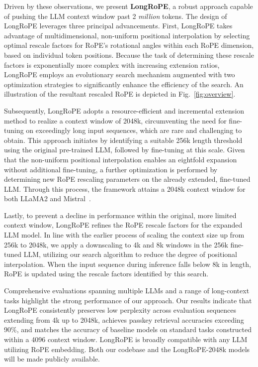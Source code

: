 Driven by these observations, we present \textbf{LongRoPE}, a robust approach capable of pushing the LLM context window past 2 \emph{million} tokens. The design of LongRoPE leverages three principal advancements. First, LongRoPE takes advantage of multidimensional, non-uniform positional interpolation by selecting optimal rescale factors for RoPE's rotational angles within each RoPE dimension, based on individual token positions. Because the task of determining these rescale factors is exponentially more complex with increasing extension ratios, LongRoPE employs an evolutionary search mechanism augmented with two optimization strategies to significantly enhance the efficiency of the search. An illustration of the resultant rescaled RoPE is depicted in Fig.~\ref{fig:overview}.

Subsequently, {LongRoPE} adopts a resource-efficient and incremental extension method to realize a context window of 2048k, circumventing the need for fine-tuning on exceedingly long input sequences, which are rare and challenging to obtain. This approach initiates by identifying a suitable 256k length threshold using the original pre-trained LLM, followed by fine-tuning at this scale. Given that the non-uniform positional interpolation enables an eightfold expansion without additional fine-tuning, a further optimization is performed by determining new RoPE rescaling parameters on the already extended, fine-tuned LLM. Through this process, the framework attains a 2048k context window for both LLaMA2 and Mistral~\cite{mistral}.

Lastly, to prevent a decline in performance within the original, more limited context window, {LongRoPE} refines the RoPE rescale factors for the expanded LLM model. In line with the earlier process of scaling the context size up from 256k to 2048k, we apply a downscaling to 4k and 8k windows in the 256k fine-tuned LLM, utilizing our search algorithm to reduce the degree of positional interpolation. When the input sequence during inference falls below 8k in length, RoPE is updated using the rescale factors identified by this search.

Comprehensive evaluations spanning multiple LLMs and a range of long-context tasks highlight the strong performance of our approach. Our results indicate that LongRoPE consistently preserves low perplexity across evaluation sequences extending from 4k up to 2048k, achieves passkey retrieval accuracies exceeding 90\%, and matches the accuracy of baseline models on standard tasks constructed within a 4096 context window. LongRoPE is broadly compatible with any LLM utilizing RoPE embedding. Both our codebase and the LongRoPE-2048k models will be made publicly available.

